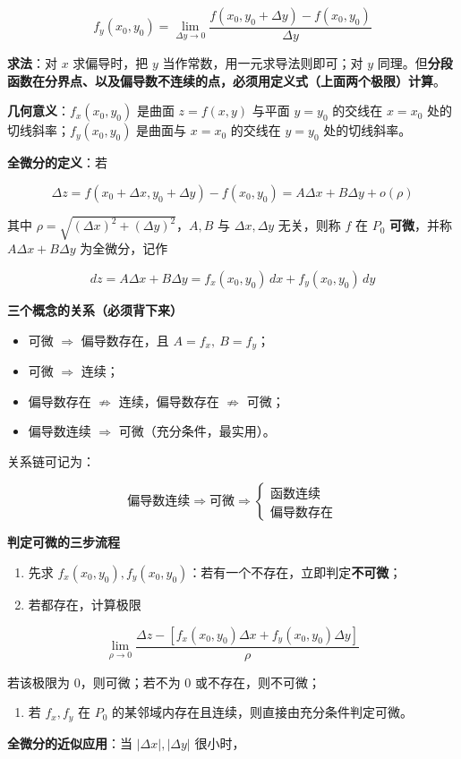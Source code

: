 \documentclass[11pt,openany,UTF8]{ctexbook}
\begin{document}
\[f_y(x_0,y_0)=\lim_{\Delta y\to 0}\frac{f(x_0,y_0+\Delta y)-f(x_0,y_0)}{\Delta y}\]

\textbf{求法}：对 $x$ 求偏导时，把 $y$ 当作常数，用一元求导法则即可；对 $y$ 同理。但\textbf{分段函数在分界点、以及偏导数不连续的点，必须用定义式（上面两个极限）计算}。

\textbf{几何意义}：$f_x(x_0,y_0)$ 是曲面 $z=f(x,y)$ 与平面 $y=y_0$ 的交线在 $x=x_0$ 处的切线斜率；$f_y(x_0,y_0)$ 是曲面与 $x=x_0$ 的交线在 $y=y_0$ 处的切线斜率。

\textbf{全微分的定义}：若

\[\Delta z=f(x_0+\Delta x,y_0+\Delta y)-f(x_0,y_0)=A\Delta x+B\Delta y+o(\rho)\]

其中 $\rho=\sqrt{(\Delta x)^{2}+(\Delta y)^{2}}$，$A,B$ 与 $\Delta x,\Delta y$ 无关，则称 $f$ 在 $P_0$ \textbf{可微}，并称 $A\Delta x+B\Delta y$ 为全微分，记作

\[dz=A\Delta x+B\Delta y=f_x(x_0,y_0)\,dx+f_y(x_0,y_0)\,dy\]

\textbf{三个概念的关系（必须背下来）}

\begin{itemize}
\item 可微 $\Rightarrow$ 偏导数存在，且 $A=f_x,\ B=f_y$；
\item 可微 $\Rightarrow$ 连续；
\item 偏导数存在 $\not\Rightarrow$ 连续，偏导数存在 $\not\Rightarrow$ 可微；
\item 偏导数连续 $\Rightarrow$ 可微（充分条件，最实用）。
\end{itemize}
关系链可记为：

\[\text{偏导数连续}\Rightarrow \text{可微}\Rightarrow \begin{cases}\text{函数连续}\\[2pt] \text{偏导数存在}\end{cases}\]

\textbf{判定可微的三步流程}

\begin{enumerate}
\item 先求 $f_x(x_0,y_0),f_y(x_0,y_0)$：若有一个不存在，立即判定\textbf{不可微}；
\item 若都存在，计算极限
\end{enumerate}
\[\lim_{\rho\to 0}\frac{\Delta z-\left[f_x(x_0,y_0)\Delta x+f_y(x_0,y_0)\Delta y\right]}{\rho}\]

若该极限为 $0$，则可微；若不为 $0$ 或不存在，则不可微；

\begin{enumerate}
\item 若 $f_x,f_y$ 在 $P_0$ 的某邻域内存在且连续，则直接由充分条件判定可微。
\end{enumerate}
\textbf{全微分的近似应用}：当 $\vert \Delta x\vert,\vert \Delta y\vert$ 很小时，
\end{document}
